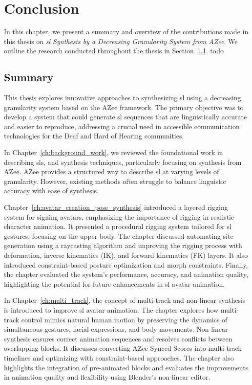 \documentclass[../../main.tex]{subfiles}
\begin{document}
\chapter{Conclusion}
\label{ch:conclusion}

In this chapter, we present a summary and overview of the contributions made in this thesis on \textit{\gls{sl} Synthesis by a Decreasing Granularity System from AZee}. We outline the research conducted throughout the thesis in Section~\ref{ch:conclusion:summary}. todo

\section{Summary}
\label{ch:conclusion:summary}

This thesis explores innovative approaches to synthesizing \gls{sl} using a decreasing granularity system based on the AZee framework. The primary objective was to develop a system that could generate \gls{sl} sequences that are linguistically accurate and easier to reproduce, addressing a crucial need in accessible communication technologies for the Deaf and Hard of Hearing communities.

In Chapter~\ref{ch:background_work}, we reviewed the foundational work in describing \gls{sl}s, and synthesis techniques, particularly focusing on synthesis from AZee. AZee provides a structured way to describe \gls{sl} at varying levels of granularity. However, existing methods often struggle to balance linguistic accuracy with ease of synthesis. 

Chapter~\ref{ch:avatar_creation_pose_synthesis} introduced a layered rigging system for signing avatars, emphasizing the importance of rigging in realistic character animation. It presented a procedural rigging system tailored for \gls{sl} gestures, focusing on the upper body. The chapter discussed automating site generation using a raycasting algorithm and improving the rigging process with deformation, inverse kinematics (IK), and forward kinematics (FK) layers. It also introduced constraint-based posture optimization and morph constraints. Finally, the chapter evaluated the system’s performance, accuracy, and animation quality, highlighting the potential for future enhancements in \gls{sl} avatar animation. 

In Chapter~\ref{ch:multi_track}, the concept of multi-track and non-linear synthesis is introduced to improve \gls{sl} avatar animation. The chapter explores how multi-track control mimics natural human motion by preserving the dynamics of simultaneous gestures, facial expressions, and body movements. Non-linear synthesis ensures correct animation sequences and resolves conflicts between overlapping blocks. It discusses converting AZee Synced Scores into multi-track timelines and optimizing with constraint-based approaches. The chapter also highlights the integration of pre-animated blocks and evaluates the improvements in animation quality and flexibility using Blender's non-linear editor.
\end{document}
